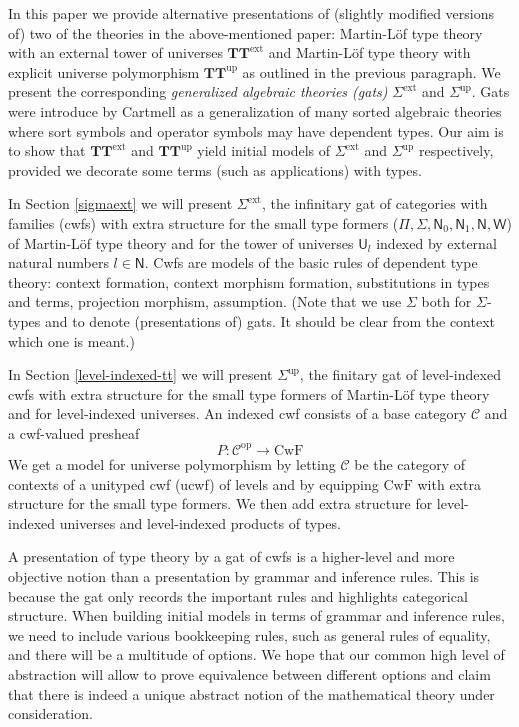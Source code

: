 \documentclass[11pt,a4paper]{article}
\theoremstyle{plain}
\theoremstyle{definition}
\newcommand{\NN}{\mathsf{N}}
\newcommand{\op}{\mathrm{op}}
\def\NN{\mathsf{N}}
\newcommand{\N}{\mathsf{N}}
\def\U{\mathsf{U}}
\def\CwF{\mathrm{CwF}}
\def\C{\mathcal{C}}
\def\W{\mathsf{W}}
\def\Sigmaext{{\Sigma^\mathrm{ext}}}
\def\Sigmaint{{\Sigma^\mathrm{up}}}
\def\TText{{\mathbf{TT}^\mathrm{ext}}}
\def\TTint{{\mathbf{TT}^\mathrm{up}}}
\begin{document}
In this paper we provide alternative presentations of (slightly modified versions of) two of the theories in the above-mentioned paper: Martin-Löf type theory with an external tower of universes $\TText$ and Martin-Löf type theory with explicit universe polymorphism $\TTint$ as outlined in the previous paragraph. We present the corresponding {\em generalized algebraic theories (gats)} $\Sigmaext$ and $\Sigmaint$. Gats were introduce by Cartmell \cite{cartmell:phd,cartmell:apal} as a generalization of many sorted algebraic theories where sort symbols and operator symbols may have dependent types. Our aim is to show that
$\TText$ and $\TTint$ yield initial models of $\Sigmaext$ and $\Sigmaint$ respectively, provided we decorate some terms (such as applications) with types.

In Section \ref{sigmaext} we will present $\Sigmaext$, the infinitary gat of categories with families (cwfs)  \cite{dybjer:torino} with extra structure for the small type formers ($\Pi, \Sigma, \N_0, \N_1, \N, \W$) of Martin-Löf type theory and for the tower of universes $\U_l$ indexed by external natural numbers $l \in \NN$. Cwfs are models of the basic rules of dependent type theory: context formation, context morphism formation, substitutions in types and terms, projection morphism, assumption.  (Note that we use $\Sigma$ both for $\Sigma$-types and to denote (presentations of) gats. It should be clear from the context which one is meant.)

In Section \ref{level-indexed-tt} we will present $\Sigmaint$, the finitary gat of level-indexed cwfs with extra structure for the small type formers of Martin-Löf type theory and for level-indexed universes. An indexed cwf consists of a base category $\C$ and a cwf-valued presheaf
$$
P : \C^\op \to \CwF
$$
We get a model for universe polymorphism by letting $\C$ be the category of contexts of a unityped cwf (ucwf) of levels and by equipping $\CwF$ with extra structure for the small type formers. We then add extra structure for level-indexed universes and level-indexed products of types.

A presentation of type theory by a gat of cwfs is a higher-level and more objective notion than a presentation by grammar and inference rules. This is because the gat only records the important rules and highlights categorical structure. When building initial models in terms of grammar and inference rules, we need to include various bookkeeping rules, such as general rules of equality, and there will be a multitude of options. We hope that our common high level of abstraction will allow to prove equivalence between different options and claim that there is indeed a unique abstract notion of the mathematical theory under consideration.
\end{document}
